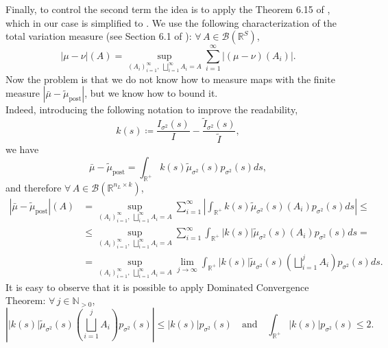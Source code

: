 \documentclass[a4paper, 11pt, reqno]{amsart}
\newcommand{\citet}[2][]{\citeauthor{#2} \cite[#1]{#2}}
\theoremstyle{plain}
\theoremstyle{remark}
\theoremstyle{definition}
\newcommand{\real}{\mathbb{R}}
\renewcommand{\natural}{\mathbb{N}}
\newcommand{\borel}[1]{\mathcal{B}\left(#1\right)}
\let\oldforall\forall
\renewcommand{\forall}{\oldforall\,}
\begin{document}
Finally, to control the second term the idea is to apply the Theorem 6.15 of \citet{otvillani2008}, which in our case is simplified to . 
We use the following characterization of the total variation measure (see Section 6.1 of \citet{rcarudin1987}): $\forall A \in \borel{\real^S}$,
\begin{equation*}
	|\mu - \nu|(A) = \sup_{\left(A_i\right)_{i = 1}^{\infty}, \ \bigsqcup_{i = 1}^{\infty} A_i = A} \sum_{i = 1}^{\infty} |(\mu - \nu)(A_i)|.
\end{equation*}
Now the problem is that we do not know how to measure maps with the finite measure $|\bar{\mu} - \widetilde{\mu}_\mathrm{post}|$, but we know how to bound it. \\
Indeed, introducing the following notation to improve the readability,
\begin{equation*}
	k(s) \coloneqq \frac{\mathit{I}_{\sigma^2}(s)}{\mathit{I}} - \frac{\widetilde{\mathit{I}}_{\sigma^2}(s)}{\widetilde{\mathit{I}}},
\end{equation*}
we have
\begin{equation*}
	\bar{\mu} - \widetilde{\mu}_{\mathrm{post}} = \int_{\real^+} k(s) \widetilde{\mu}_{\sigma^2}(s) p_{\sigma^2}(s) ds,
\end{equation*}
and therefore $\forall A \in \borel{\real^{n_L \times k}}$, 
\begin{equation*}
	\begin{aligned}
		|\bar{\mu} - \widetilde{\mu}_\mathrm{post}|(A) & = \sup_{\left(A_i\right)_{i = 1}^{\infty}, \ \bigsqcup_{i = 1}^{\infty} A_i = A} \sum_{i = 1}^{\infty} \left|\int_{\real^+} k(s) \widetilde{\mu}_{\sigma^2}(s)(A_i) p_{\sigma^2}(s) ds\right| \leq \\
		& \leq \sup_{\left(A_i\right)_{i = 1}^{\infty}, \ \bigsqcup_{i = 1}^{\infty} A_i = A} \sum_{i = 1}^{\infty} \int_{\real^+} |k(s)| \widetilde{\mu}_{\sigma^2}(s)(A_i) p_{\sigma^2}(s) ds = \\
		& = \sup_{\left(A_i\right)_{i = 1}^{\infty}, \ \bigsqcup_{i = 1}^{\infty} A_i = A} \lim_{j \to \infty} \int_{\real^+} |k(s)| \widetilde{\mu}_{\sigma^2}(s)\left(\bigsqcup_{i = 1}^j A_i\right) p_{\sigma^2}(s) ds.
	\end{aligned}
\end{equation*}
It is easy to observe that it is possible to apply Dominated Convergence Theorem: $\forall j \in \natural_{> 0}$,
\begin{equation*}
	\left||k(s)| \widetilde{\mu}_{\sigma^2}(s)\left(\bigsqcup_{i = 1}^j A_i\right) p_{\sigma^2}(s)\right| \leq |k(s)| p_{\sigma^2}(s) \quad \text{and} \quad \int_{\real^+} |k(s)| p_{\sigma^2}(s) \leq 2.
\end{equation*}
\end{document}
